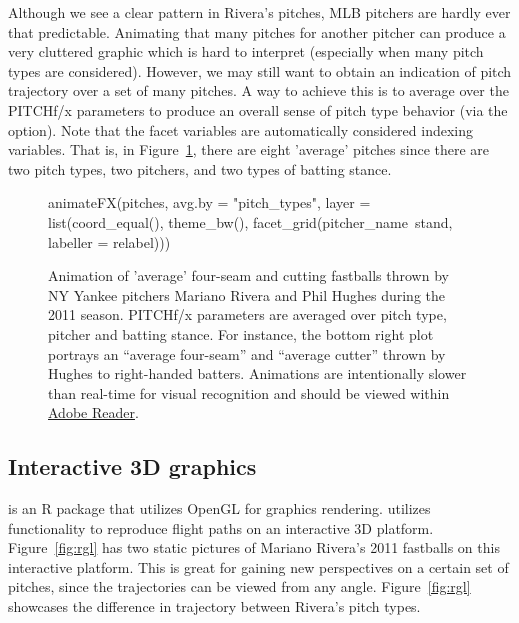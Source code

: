 \documentclass[a4paper]{report}\usepackage[]{graphicx}\usepackage[]{color}
\begin{document}
\begin{article}
Although we see a clear pattern in Rivera's pitches, MLB pitchers
are hardly ever that predictable. Animating that many pitches for
another pitcher can produce a very cluttered graphic which is hard
to interpret (especially when many pitch types are considered). However,
we may still want to obtain an indication of pitch trajectory over
a set of many pitches. A way to achieve this is to average over the
PITCHf/x parameters to produce an overall sense of pitch type behavior
(via the  option). Note that the facet variables are
automatically considered indexing variables. That is, in Figure~\ref{fig:animate2},
there are eight 'average' pitches since there are two pitch types,
two pitchers, and two types of batting stance.

\begin{figure}[h]
\begin{Schunk}
\begin{Sinput}
animateFX(pitches, avg.by = "pitch_types", layer = list(coord_equal(), theme_bw(),
  facet_grid(pitcher_name~stand, labeller = relabel)))
\end{Sinput}

\end{Schunk}


\caption{\label{fig:animate2}Animation of 'average' four-seam and cutting
fastballs thrown by NY Yankee pitchers Mariano Rivera and Phil Hughes
during the 2011 season. PITCHf/x parameters are averaged over pitch
type, pitcher and batting stance. For instance, the bottom right plot
portrays an ``average four-seam'' and ``average cutter'' thrown
by Hughes to right-handed batters. Animations are intentionally slower
than real-time for visual recognition and should be viewed within
\protect\href{http://get.adobe.com/reader/}{Adobe Reader}.}
\end{figure}



\subsection{Interactive 3D graphics}

 is an R package that utilizes OpenGL for graphics rendering.
 utilizes  functionality to reproduce
flight paths on an interactive 3D platform. Figure~\ref{fig:rgl}
has two static pictures of Mariano Rivera's 2011 fastballs on this
interactive platform. This is great for gaining new perspectives on
a certain set of pitches, since the trajectories can be viewed from
any angle. Figure~\ref{fig:rgl} showcases the difference in trajectory
between Rivera's pitch types.


\end{article}
\end{document}
